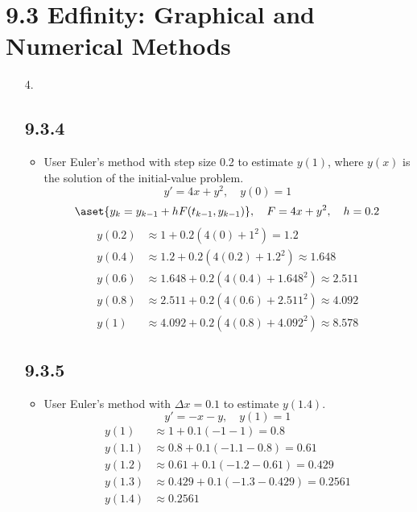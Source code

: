 \section{9.3 Edfinity: Graphical and Numerical Methods}
\begin{itemize}
  \item[4.]

  \subsection{9.3.4}
  \begin{itemize}
    \item User Euler's method with step size 0.2 to estimate \( y(1) \), where
      \( y(x) \) is the solution of the initial-value problem.
    \[%
      y' = 4x + y^2, \quad y(0) = 1
    \]%
    \[%
      \aset{y_k = y_{k-1} + hF(t_{k-1},y_{k-1})}, \quad F = 4x + y^2, \quad h = 0.2
    \]%
    \begin{align*}
      y(0.2) &\approx 1 + 0.2(4(0) + 1^2) = 1.2 \\
      y(0.4) &\approx 1.2 + 0.2(4(0.2) + 1.2^2) \approx 1.648  \\
      y(0.6) &\approx 1.648 + 0.2(4(0.4) + 1.648^2) \approx  2.511 \\
      y(0.8) &\approx 2.511 + 0.2(4(0.6) + 2.511^2) \approx 4.092  \\
      y(1) &\approx 4.092 + 0.2(4(0.8) + 4.092^2) \approx 8.578
    \end{align*}
  \end{itemize}

  \subsection{9.3.5}
  \begin{itemize}
    \item User Euler's method with \( \Delta x = 0.1 \) to estimate \( y(1.4) \).
    \[%
      y' = -x - y, \quad y(1) = 1
    \]%
    \begin{align*}
      y(1) &\approx 1 + 0.1(-1 - 1) = 0.8 \\
      y(1.1) &\approx 0.8 + 0.1(-1.1 - 0.8) = 0.61  \\
      y(1.2) &\approx 0.61 + 0.1(-1.2 - 0.61) = 0.429 \\
      y(1.3) &\approx 0.429 + 0.1(-1.3 - 0.429) = 0.2561 \\
      y(1.4) &\approx 0.2561
    \end{align*}

  \end{itemize}

\end{itemize}
